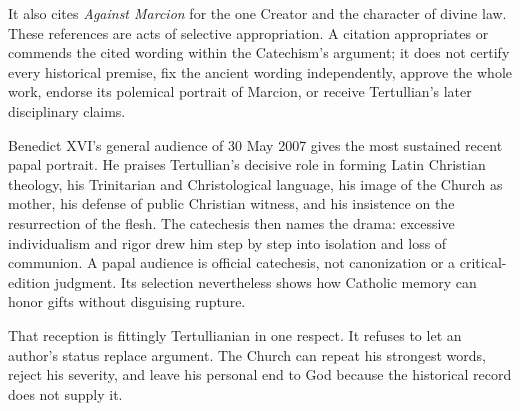 It also cites \emph{Against Marcion} for the one Creator and the character of
divine law. These references are acts of selective appropriation. A citation
appropriates or commends the cited wording within the Catechism's argument; it
does not certify every historical premise, fix the ancient wording independently,
approve the whole work, endorse its polemical portrait of Marcion, or receive
Tertullian's later disciplinary claims.

Benedict XVI's general audience of 30 May 2007 gives the most sustained recent
papal portrait. He praises Tertullian's decisive role in forming Latin Christian
theology, his Trinitarian and Christological language, his image of the Church
as mother, his defense of public Christian witness, and his insistence on the
resurrection of the flesh. The catechesis then names the drama: excessive
individualism and rigor drew him step by step into isolation and loss of
communion. A papal audience is official catechesis, not canonization or a
critical-edition judgment. Its selection nevertheless shows how Catholic memory
can honor gifts without disguising rupture.

That reception is fittingly Tertullianian in one respect. It refuses to let an
author's status replace argument. The Church can repeat his strongest words,
reject his severity, and leave his personal end to God because the historical
record does not supply it.
